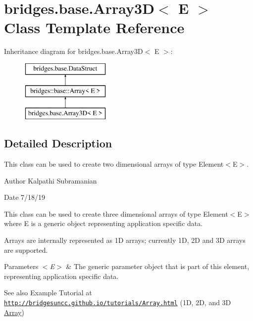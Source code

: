 \hypertarget{classbridges_1_1base_1_1_array3_d}{}\section{bridges.\+base.\+Array3D$<$ E $>$ Class Template Reference}
\label{classbridges_1_1base_1_1_array3_d}
Inheritance diagram for bridges.\+base.\+Array3D$<$ E $>$\+:\begin{figure}[H]
\begin{center}
\leavevmode
\includegraphics[height=3.000000cm]{classbridges_1_1base_1_1_array3_d}
\end{center}
\end{figure}


\subsection{Detailed Description}
This class can be used to create two dimensional arrays of type Element$<$\+E$>$. 

\begin{DoxyAuthor}{Author}
Kalpathi Subramanian
\end{DoxyAuthor}
\begin{DoxyDate}{Date}
7/18/19
\end{DoxyDate}
This class can be used to create three dimensional arrays of type Element$<$\+E$>$ where E is a generic object representing application specific data.

Arrays are internally represented as 1D arrays; currently 1D, 2D and 3D arrays are supported.


\begin{DoxyParams}{Parameters}
{\em $<$\+E$>$} & The generic parameter object that is part of this element, representing application specific data.\\
\hline
\end{DoxyParams}
\begin{DoxySeeAlso}{See also}
Example Tutorial at ~\newline
 \href{http://bridgesuncc.github.io/tutorials/Array.html}{\tt http\+://bridgesuncc.\+github.\+io/tutorials/\+Array.\+html} (1D, 2D, and 3D \hyperlink{classbridges_1_1base_1_1_array}{Array})~\newline
 
\end{DoxySeeAlso}
